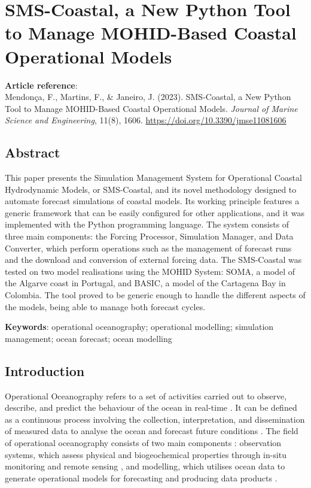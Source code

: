 \chapter{SMS-Coastal, a New Python Tool to Manage MOHID-Based Coastal Operational Models} \label{sec:cp4}
\vspace{\fill}
\textbf{Article reference}:\\
Mendonça, F., Martins, F., \& Janeiro, J. (2023). SMS-Coastal, a New Python Tool to Manage MOHID-Based Coastal Operational Models. \textit{Journal of Marine Science and Engineering}, 11(8), 1606. \href{https://doi.org/10.3390/jmse11081606}{https://doi.org/10.3390/jmse11081606}
\clearpage

\section{Abstract}
This paper presents the Simulation Management System for Operational Coastal Hydrodynamic Models, or SMS-Coastal, and its novel methodology designed to automate forecast simulations of coastal models. Its working principle features a generic framework that can be easily configured for other applications, and it was implemented with the Python programming language. The system consists of three main components: the Forcing Processor, Simulation Manager, and Data Converter, which perform operations such as the management of forecast runs and the download and conversion of external forcing data. The SMS-Coastal was tested on two model realisations using the MOHID System: SOMA, a model of the Algarve coast in Portugal, and BASIC, a model of the Cartagena Bay in Colombia. The tool proved to be generic enough to handle the different aspects of the models, being able to manage both forecast cycles.

\vspace{15mm}
\noindent\textbf{Keywords}: operational oceanography; operational modelling; simulation management; ocean forecast; ocean modelling
\vspace{10mm}

\section{Introduction} \label{sec:cp4_intro}
Operational Oceanography refers to a set of activities carried out to observe, describe, and predict the behaviour of the ocean in real-time \parencite{robinson2010introduction, vonschuckmann2016copernicus}. It can be defined as a continuous process involving the collection, interpretation, and dissemination of measured data to analyse the ocean and forecast future conditions \parencite{prandle2000introduction}. The field of operational oceanography consists of two main components \parencite{dombrowsky2011overview}: observation systems, which assess physical and biogeochemical properties through in-situ monitoring and remote sensing \parencite{send2006insitu, ravichandran2011insitu}, and modelling, which utilises ocean data to generate operational models for forecasting and producing data products \parencite{pouliquen2006insitu}.

